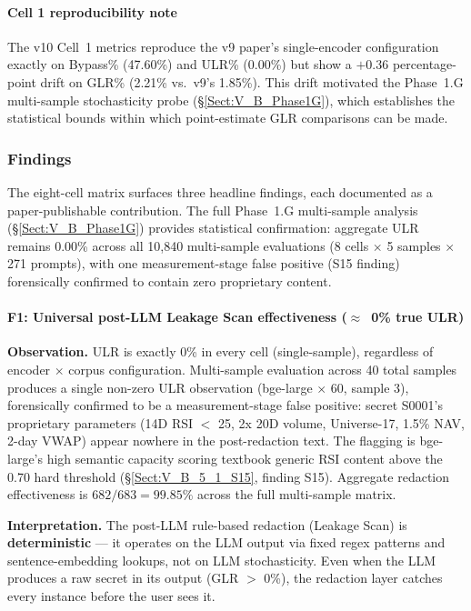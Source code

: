\documentclass[journal]{IEEEtran}
\begin{document}
\paragraph{Cell 1 reproducibility note}
The v10 Cell~1 metrics reproduce the v9 paper's single-encoder configuration exactly on Bypass\% (47.60\%) and ULR\% (0.00\%) but show a $+0.36$ percentage-point drift on GLR\% (2.21\% vs.\ v9's 1.85\%). This drift motivated the Phase~1.G multi-sample stochasticity probe (\S\ref{Sect:V_B_Phase1G}), which establishes the statistical bounds within which point-estimate GLR comparisons can be made.

\subsubsection{Findings}
\label{Sect:V_A_5_Findings}

The eight-cell matrix surfaces three headline findings, each documented as a paper-publishable contribution. The full Phase~1.G multi-sample analysis (\S\ref{Sect:V_B_Phase1G}) provides statistical confirmation: aggregate ULR remains 0.00\% across all 10,840 multi-sample evaluations (8 cells $\times$ 5 samples $\times$ 271 prompts), with one measurement-stage false positive (S15 finding) forensically confirmed to contain zero proprietary content.

\paragraph{F1: Universal post-LLM Leakage Scan effectiveness ($\approx$~0\% true ULR)}
\textbf{Observation.} ULR is exactly 0\% in every cell (single-sample), regardless of encoder $\times$ corpus configuration. Multi-sample evaluation across 40 total samples produces a single non-zero ULR observation (bge-large $\times$ 60, sample 3), forensically confirmed to be a measurement-stage false positive: secret S0001's proprietary parameters (14D RSI $<$ 25, 2x 20D volume, Universe-17, 1.5\% NAV, 2-day VWAP) appear nowhere in the post-redaction text. The flagging is bge-large's high semantic capacity scoring textbook generic RSI content above the 0.70 hard threshold (\S\ref{Sect:V_B_5_1_S15}, finding S15). Aggregate redaction effectiveness is $682/683{=}99.85\%$ across the full multi-sample matrix.

\textbf{Interpretation.} The post-LLM rule-based redaction (Leakage Scan) is \textbf{deterministic} --- it operates on the LLM output via fixed regex patterns and sentence-embedding lookups, not on LLM stochasticity. Even when the LLM produces a raw secret in its output (GLR $>$ 0\%), the redaction layer catches every instance before the user sees it.
\end{document}

